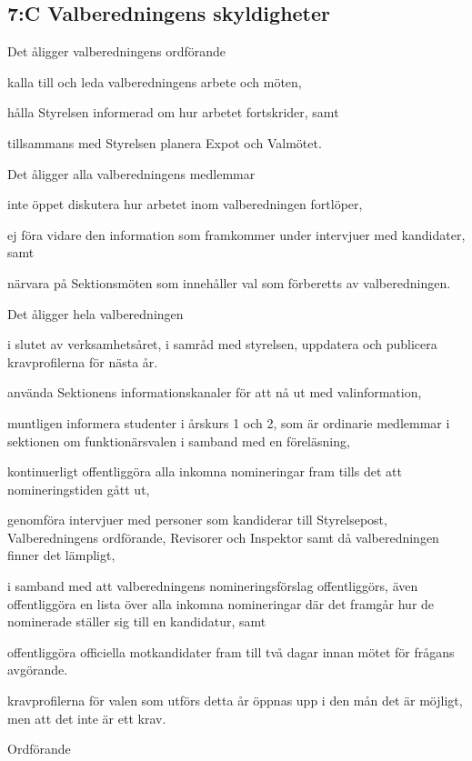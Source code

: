\documentclass[../_main/handlingar.tex]{subfiles}
\begin{document}
\begin{attsatser}
        \subsection*{7:C Valberedningens skyldigheter}
        Det åligger valberedningens ordförande
        \begin{attlist}
            \item kalla till och leda valberedningens arbete och möten,
            \item hålla Styrelsen informerad om hur arbetet fortskrider, samt
            \item tillsammans med Styrelsen planera Expot och Valmötet.
        \end{attlist}
        Det åligger alla valberedningens medlemmar
        \begin{attlist}
            \item inte öppet diskutera hur arbetet inom valberedningen fortlöper,
            \item ej föra vidare den information som framkommer under intervjuer med kandidater, samt
            \item närvara på Sektionsmöten som innehåller val som förberetts av valberedningen.
        \end{attlist}
        Det åligger hela valberedningen
        \begin{attlist}
            \item i slutet av verksamhetsåret, i samråd med styrelsen, uppdatera och publicera kravprofilerna för nästa år.
            \item använda Sektionens informationskanaler för att nå ut med valinformation,
            \item muntligen informera studenter i årskurs 1 och 2, som är ordinarie medlemmar i sektionen om funktionärsvalen i samband med en föreläsning,
            \item kontinuerligt offentliggöra alla inkomna nomineringar fram tills det att nomineringstiden gått ut,
            \item genomföra intervjuer med personer som kandiderar till Styrelsepost, Valberedningens ordförande, Revisorer och Inspektor samt då valberedningen finner det lämpligt,
            \item i samband med att valberedningens nomineringsförslag offentliggörs, även offentliggöra en lista över alla inkomna nomineringar där det framgår hur de nominerade ställer sig till en kandidatur, samt
            \item offentliggöra officiella motkandidater fram till två dagar innan mötet för frågans avgörande.
        \end{attlist}
    \att kravprofilerna för valen som utförs detta år öppnas upp i den mån det är möjligt, men att det inte är ett krav.
\end{attsatser}

\begin{signatures}{1}
    \ist
    \signature{\ordf}{Ordförande}
\end{signatures}
\end{document}
